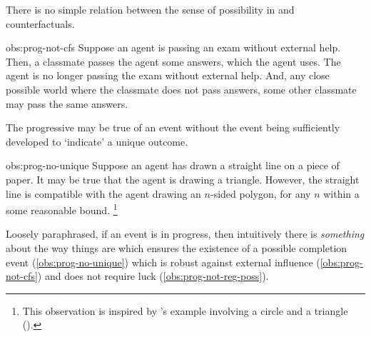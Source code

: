 \begin{note}
  \begin{observation}%
    \label{obs:prog-not-cfs}%
    There is no simple relation between the sense of possibility in \assuPP{} and counterfactuals.
  \end{observation}
  \begin{motivation}{obs:prog-not-cfs}
    Suppose an agent is passing an exam without external help.
    Then, a classmate passes the agent some answers, which the agent uses.
    The agent is no longer passing the exam without external help.
    And, any close possible world where the classmate does not pass answers, some other classmate may pass the same answers.
  \end{motivation}

  \begin{observation}%
    \label{obs:prog-no-unique}%
    The progressive may be true of an event without the event being sufficiently developed to `indicate' a unique outcome.
  \end{observation}
  \begin{motivation}{obs:prog-no-unique}
    Suppose an agent has drawn a straight line on a piece of paper.
    It may be true that the agent is drawing a triangle.
    However, the straight line is compatible with the agent drawing an \(n\)-sided polygon, for any \(n\) within a some reasonable bound.%
    \footnote{
      This observation is inspired by \citeauthor{Dowty:1979vq}'s example involving a circle and a triangle (\citeyear[133]{Dowty:1979vq}).
    }
  \end{motivation}

  \noindent%
  Loosely paraphrased, if an event is in progress, then intuitively there is \emph{something} about the way things are which ensures the existence of a possible completion event (\autoref{obs:prog-no-unique}) which is robust against external influence (\autoref{obs:prog-not-cfs}) and does not require luck (\autoref{obs:prog-not-reg-poss}).
\end{note}


